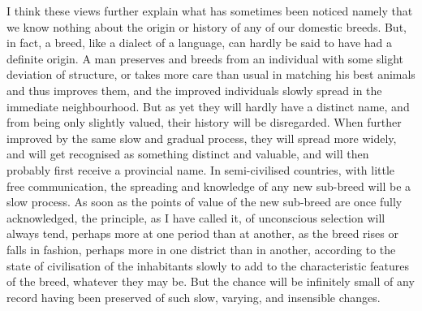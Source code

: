 \indent I think these views further explain what has sometimes been noticed   namely that we know nothing about the origin or history of any of our domestic breeds. But, in fact, a breed, like a dialect of a language, can hardly be said to have had a definite origin. A man preserves and breeds from an individual with some slight deviation of structure, or takes more care than usual in matching his best animals and thus improves them, and the improved individuals slowly spread in the immediate neighbourhood. But as yet they will hardly have a distinct name, and from being only slightly valued, their history will be disregarded. When further improved by the same slow and gradual process, they will spread more widely, and will get recognised as something distinct and valuable, and will then probably first receive a provincial name. In semi-civilised countries, with little free communication, the spreading and knowledge of any new sub-breed will be a slow process. As soon as the points of value of the new sub-breed are once fully acknowledged, the principle, as I have called it, of unconscious selection will always tend, perhaps more at one period than at another, as the breed rises or falls in fashion, perhaps more in one district than in another, according to the state of civilisation of the inhabitants slowly to add to the characteristic features of the breed, whatever they may be. But the chance will be infinitely small of any record having been preserved of such slow, varying, and insensible changes.  \\
